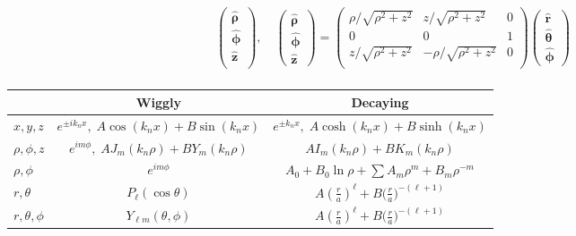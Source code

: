 \documentclass[10pt]{article}
\newcommand{\rhat}{\boldsymbol{\hat{\textbf{r}}}}
\newcommand{\zhat}{\boldsymbol{\hat{\textbf{z}}}}
\newcommand{\phihat}{\boldsymbol{\hat{\textbf{$\phi$}}}}
\newcommand{\thetahat}{\boldsymbol{\hat{\textbf{$\theta$}}}}
\newcommand{\rhohat}{\boldsymbol{\hat{\textbf{$\rho$}}}}
\begin{document}
\begin{multicols}{2}
\begin{align*}
\begin{pmatrix}
 			\rhohat \\
 			\phihat \\
 			\zhat \\
 		\end{pmatrix}, \quad 
 		\begin{pmatrix}
			\rhohat \\
			\phihat \\
			\zhat
 		\end{pmatrix} = 
 		\begin{pmatrix}
 			\rho / \sqrt{\rho^2 + z^2} & z / \sqrt{\rho^2 + z^2} & 0 \\
 			0 & 0 & 1 \\
 			z / \sqrt{\rho^2 + z^2} & - \rho /\sqrt{\rho^2 + z^2} & 0 \\
 		\end{pmatrix}
 		\begin{pmatrix}
			\rhat \\
			\thetahat \\
			\phihat
 		\end{pmatrix} \\
 	\end{align*}
	\renewcommand{\arraystretch}{2}
	\begin{tabular}{| l | c | c |} \hline
		& Wiggly & Decaying \\ \hline
		$x,y,z$ &$ e^{\pm i k_n x}, \; A \cos(k_n x) + B\sin(k_n x)$ & $e^{\pm k_n x}, \; A \cosh( k_n x) + B \sinh(k_n x)$ \\ \hline
		$\rho,\phi,z$ & $e^{i m \phi}, \; A J_m(k_n \rho) + B Y_m(k_n \rho)$ & $ A I_m(k_n \rho) + B K_m(k_n \rho)$ \\ \hline
		$\rho,\phi$ & $e^{i m \phi}$ & $A_0 + B_0 \ln \rho + \sum A_m \rho^m + B_m \rho^{-m}$ \\ \hline
		$r,\theta$ & $P_\ell(\cos \theta)$ & $A \left( \frac{r}{a} \right)^\ell + B \big( \frac{r}{a} \big)^{-(\ell+1)} $ \\ \hline
		$r, \theta, \phi$ & $Y_{\ell m}(\theta, \phi)$ &  $A \left( \frac{r}{a} \right)^\ell + B \big( \frac{r}{a} \big)^{-(\ell+1)} $ \\ \hline
	\end{tabular}
\end{multicols}
 
\end{document}
